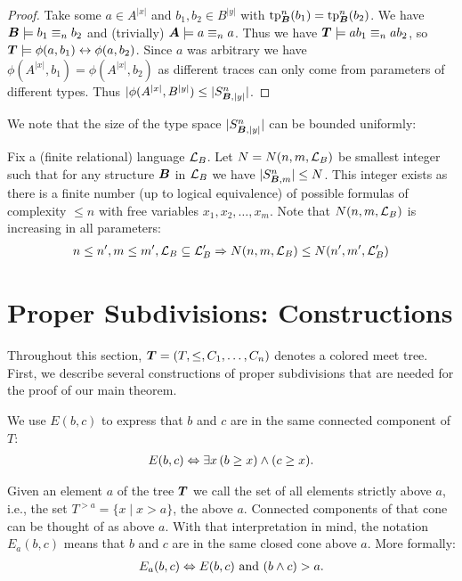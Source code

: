 \begin{proof}
  Take some $a \in A^{|x|}$ and $b_1, b_2 \in B^{|y|}$ with $\operatorname{tp}^n_{\operatorname{\boldsymbol B}}(b_1) = \operatorname{tp}^n_{\operatorname{\boldsymbol B}}(b_2)$. We have $\operatorname{\boldsymbol B} \models b_1 \equiv_n b_2$ and (trivially) $\operatorname{\boldsymbol A} \models a \equiv_n a$. Thus  we have $\operatorname{\boldsymbol T} \models ab_1 \equiv_n ab_2$, so $\operatorname{\boldsymbol T} \models \phi(a, b_1) \leftrightarrow \phi(a, b_2)$. Since $a$ was arbitrary we have $\phi(A^{|x|}, b_1) = \phi(A^{|x|}, b_2)$ as different traces can only come from parameters of different types. Thus $|\phi(A^{|x|}, B^{|y|}) \leq |S^n_{\operatorname{\boldsymbol B}, |y|}|$.
\end{proof}

We note that the size of the type space $|S^n_{\operatorname{\boldsymbol B}, |y|}|$ can be bounded uniformly:

\begin{Definition} \label{def_type_count}
  Fix a (finite relational) language $\mathcal L_B$. Let $N = N(n, m, \mathcal L_B)$ be smallest integer such that for any structure $\operatorname{\boldsymbol B}$ in $\mathcal L_B$ we have $|S^n_{\operatorname{\boldsymbol B}, m}| \leq N$. This integer exists as there is a finite number (up to logical equivalence) of possible formulas of complexity $\leq n$ with free variables $x_1,x_2, \ldots, x_m$.
  Note that $N(n, m, \mathcal L_B)$ is increasing in all parameters:
  \begin{align*}
    n \leq n', m \leq m', \mathcal L_B \subseteq \mathcal L_B' \Rightarrow N(n, m, \mathcal L_B) \leq N(n', m', \mathcal L_B')
  \end{align*}
\end{Definition}

\section{Proper Subdivisions: Constructions}
Throughout this section, $\operatorname{\boldsymbol T} = (T, \leq, C_1, \ldots, C_n)$ denotes a colored meet tree.
First, we describe several constructions of proper subdivisions that are needed for the proof of our main theorem. 

\begin{Definition}
  We use $E(b,c)$ to express that $b$ and $c$ are in the same connected component of $T$:
  \begin{align*}
    E(b, c) \Leftrightarrow \exists x \, (b \geq x) \wedge (c \geq x).
  \end{align*}
\end{Definition}
\begin{Definition}
  Given an element $a$ of the tree $\operatorname{\boldsymbol T}$ we call the set of all elements strictly above $a$, i.e., the set $T^{> a} = \{x \mid x > a\}$,
  the  above $a$.
  Connected components of that cone can be thought of as  above $a$.
  With that interpretation in mind, the notation $E_a(b, c)$ means that $b$ and $c$ are in the same closed cone above $a$. More formally:
  \begin{align*}
    E_a(b, c) \Leftrightarrow E(b,c) \text{ and } (b \wedge c) > a.
  \end{align*}
\end{Definition}

